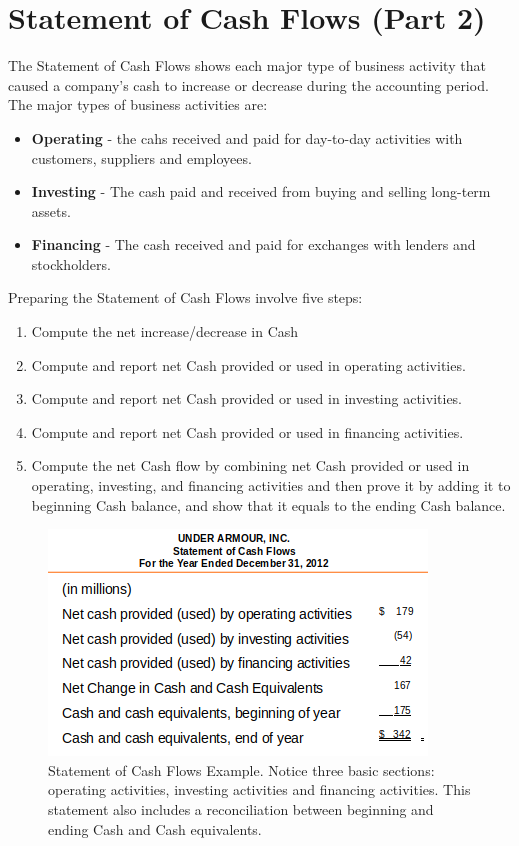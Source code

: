 \documentclass[../main.tex]{subfiles}
\begin{document}
	\section{Statement of Cash Flows (Part 2)}
	
	The Statement of Cash Flows shows each major type of business activity that 
	caused a company’s cash to increase or decrease during the accounting  
	period. The major types of business activities are:
	\begin{itemize}[noitemsep]
		\item \textbf{Operating} - the cahs received and paid for day-to-day 
		activities with customers, suppliers and employees.
		\item \textbf{Investing} - The cash paid and received from buying and 
		selling long-term assets.
		\item \textbf{Financing} - The cash received and paid for exchanges 
		with lenders and stockholders. 
	\end{itemize}

	Preparing the Statement of Cash Flows involve five steps:
	\begin{enumerate}[noitemsep]
		\item Compute the net increase/decrease in Cash
		\item Compute and report net Cash provided or used in operating 
		activities.
		\item Compute and report net Cash provided or used in investing 
		activities.
		\item Compute and report net Cash provided or used in financing
		activities.
		\item Compute the net Cash flow by combining net Cash provided or used 
		in operating, investing, and financing activities and then prove it by 
		adding it to beginning Cash balance, and show that it equals to the 
		ending Cash balance. 
	\end{enumerate}
	
	
	\begin{figure}[ht]
		\centering
		\includegraphics[width=0.7\columnwidth]{images/c11/cash_flows.png}
		\caption{\label{fig:soc_example} Statement of Cash Flows Example. 
		Notice three basic sections: operating activities, investing activities 
		and financing activities. This statement also includes a reconciliation 
		between beginning and ending Cash and Cash equivalents.}
	\end{figure}
	
\end{document}
